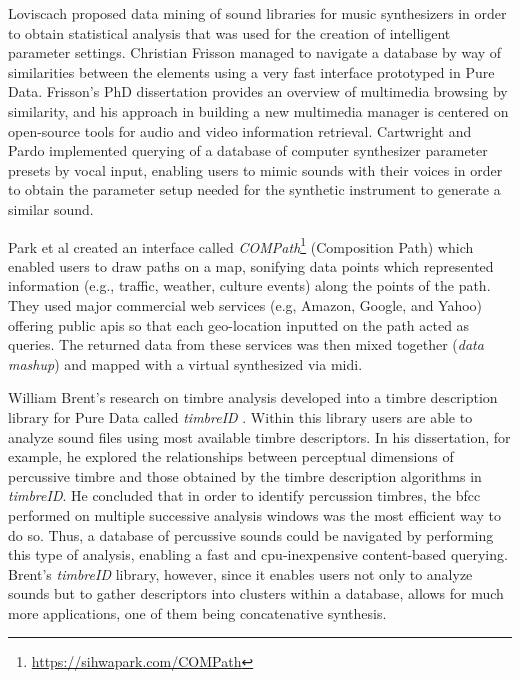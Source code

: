 Loviscach \parencite{Loviscach2008} proposed data mining of sound libraries for music synthesizers in order to obtain statistical analysis that was used for the creation of intelligent parameter settings. Christian Frisson \parencite{Frisson2010} managed to navigate a database by way of similarities between the elements using a very fast interface prototyped in Pure Data. Frisson's PhD dissertation \parencite{Frisson2015} provides an overview of multimedia browsing by similarity, and his approach in building a new multimedia manager is centered on open-source tools for audio and video information retrieval. Cartwright and Pardo \parencite{mcartwright:2014} implemented querying of a database of computer synthesizer parameter presets by vocal input, enabling users to mimic sounds with their voices in order to obtain the parameter setup needed for the synthetic instrument to generate a similar sound.

Park et al \parencite{icmc/bbp2372.2010.002} created an interface called \textit{COMPath}\footnote{\url{https://sihwapark.com/COMPath}} (Composition Path) which enabled users to draw paths on a map, sonifying data points which represented information (e.g., traffic, weather, culture events) along the points of the path. They used major commercial web services (e.g, Amazon, Google, and Yahoo) offering public \glspl{api} so that each geo-location inputted on the path acted as queries. The returned data from these services was then mixed together (\textit{data mashup}) and mapped with a virtual synthesized via \gls{midi}.

William Brent's research on timbre analysis \parencite{Brent/2010/phdthesis} developed into a timbre description library for Pure Data called \textit{timbreID} \parencite{icmc/bbp2372.2010.044}. Within this library users are able to analyze sound files using most available timbre descriptors. In his dissertation, for example, he explored the relationships between perceptual dimensions of percussive timbre and those obtained by the timbre description algorithms in \textit{timbreID}. He concluded that in order to identify percussion timbres, the \gls{bfcc} performed on multiple successive analysis windows was the most efficient way to do so. Thus, a database of percussive sounds could be navigated by performing this type of analysis, enabling a fast and \gls{cpu}-inexpensive content-based querying. Brent's \textit{timbreID} library, however, since it enables users not only to analyze sounds but to gather descriptors into clusters within a database, allows for much more applications, one of them being concatenative synthesis.


